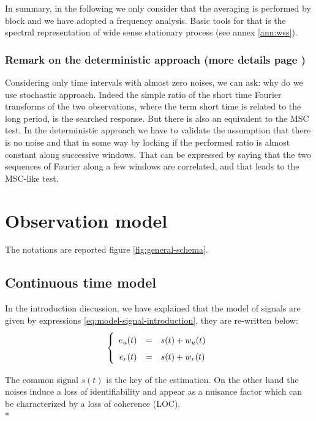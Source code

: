 In summary, in the following we only consider that the averaging is performed by block and we have adopted a frequency analysis. Basic tools for that is the spectral representation of wide sense stationary process (see annex \ref{ann:wss}).




\subsubsection{Remark on the deterministic approach (more details page \pageref{ann:deterministic-approach})}
Considering only time intervals with almost zero noises, we can ask: why do we use stochastic approach. Indeed the simple ratio of the short time Fourier transforms of the two observations, where the term short time is related to the long period, is the searched response. But there is also an equivalent to the MSC test. In the deterministic approach we have to validate the assumption that there is no noise and that in some way by locking if the performed ratio is almost constant along successive windows. That can be expressed by saying that the two sequences of Fourier along a few windows are correlated, and that leads to the MSC-like test.


\section{Observation model}
The notations are reported figure \ref{fig:general-schema}.  
\subsection{Continuous time model}

In the introduction discussion, we have explained that the model of signals are given by expressions \eqref{eq:model-signal-introduction}, they are re-written below:
\begin{eqnarray}
\label{eq:model-of-excitation}
\left\{
\renewcommand\arraystretch{1.6}
\begin{array}{rcl}
e_{\ut}(t)&=&s(t)+w_{\ut}(t)
\\
e_{\rf}(t)&=&s(t)+w_{\rf}(t)
\end{array}
\right.
\end{eqnarray}


The common signal $s(t)$ is the key of the estimation. On the other hand the noises induce a loss of identifiability and appear as a nuisance factor which can be characterized by a loss of coherence (LOC). \\*


